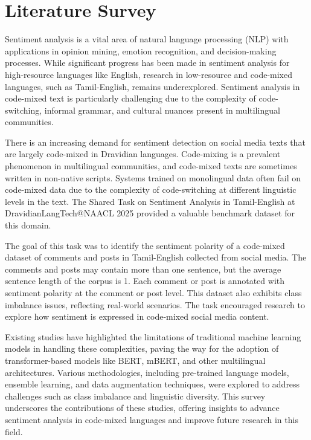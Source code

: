 \documentclass[11pt]{article}
\begin{document}
\section{Literature Survey}

Sentiment analysis is a vital area of natural language processing (NLP) with applications in opinion mining, emotion recognition, and decision-making processes. While significant progress has been made in sentiment analysis for high-resource languages like English, research in low-resource and code-mixed languages, such as Tamil-English, remains underexplored. Sentiment analysis in code-mixed text is particularly challenging due to the complexity of code-switching, informal grammar, and cultural nuances present in multilingual communities.

There is an increasing demand for sentiment detection on social media texts that are largely code-mixed in Dravidian languages. Code-mixing is a prevalent phenomenon in multilingual communities, and code-mixed texts are sometimes written in non-native scripts. Systems trained on monolingual data often fail on code-mixed data due to the complexity of code-switching at different linguistic levels in the text. The Shared Task on Sentiment Analysis in Tamil-English at DravidianLangTech@NAACL 2025 provided a valuable benchmark dataset for this domain.

The goal of this task was to identify the sentiment polarity of a code-mixed dataset of comments and posts in Tamil-English collected from social media. The comments and posts may contain more than one sentence, but the average sentence length of the corpus is 1. Each comment or post is annotated with sentiment polarity at the comment or post level. This dataset also exhibits class imbalance issues, reflecting real-world scenarios. The task encouraged research to explore how sentiment is expressed in code-mixed social media content.

Existing studies have highlighted the limitations of traditional machine learning models in handling these complexities, paving the way for the adoption of transformer-based models like BERT, mBERT, and other multilingual architectures. Various methodologies, including pre-trained language models, ensemble learning, and data augmentation techniques, were explored to address challenges such as class imbalance and linguistic diversity. This survey underscores the contributions of these studies, offering insights to advance sentiment analysis in code-mixed languages and improve future research in this field.
\end{document}
